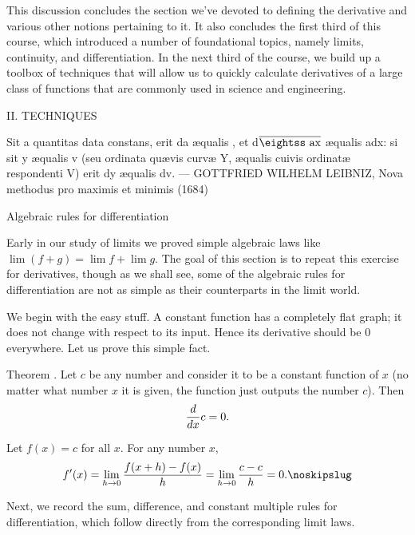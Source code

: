 This discussion concludes the section we've devoted to defining the derivative and various other
notions pertaining to it. It also concludes the first third of this course, which introduced a number of
foundational topics, namely limits, continuity, and differentiation. In the next
third of the course, we build up a toolbox of techniques that will allow us to quickly calculate derivatives
of a large class of functions that are commonly used in science and engineering.

\vfill\eject
\begingroup\headline{\hfil}\footline{\hfil}
\centerline{\titlefont II. TECHNIQUES}
\vskip220pt
\bigskip
\begingroup\obeylines\eightssi
\hfill Sit {\eightss a} quantitas data constans,
\hfill erit {\eightss da} {\ae}qualis {},
\hfill et {\eightss d$\overline{\hbox{\eightss ax}}$} {\ae}qualis {\eightss adx}:
\hfill si sit {\eightss y} {\ae}qualis {\eightss v}
\hfill (seu ordinata qu{\ae}vis curv{\ae} {\eightss Y},
\hfill {\ae}qualis cuivis ordinat{\ae} respondenti {\eightss V})
\hfill erit {\eightss dy} {\ae}qualis {\eightss dv}.
\eightss
\smallskip
\hfill --- GOTTFRIED WILHELM LEIBNIZ, {\eightssi Nova methodus pro maximis et minimis} (1684)
\endgroup%
\bigskip\goodbreak
\vfill\eject
\endgroup%

\advsect Algebraic rules for differentiation

Early in our study of limits we proved simple algebraic laws like $\lim (f+g) = \lim f + \lim g$. The
goal of this section is to repeat this exercise for derivatives, though as we shall see, some of the
algebraic rules for differentiation are not as simple as their counterparts in the limit world.

We begin with the easy stuff.
A constant function has a completely flat graph; it does not change with respect to its input.
Hence its derivative should be $0$ everywhere. Let us prove this simple fact.

\edef\thmconstantderiv{\the\thmcount}
\proclaim Theorem \advthm. Let $c$ be any number and consider it to be a constant
function of $x$ (no matter what number
$x$ it is given, the function just outputs the number $c$). Then
$${d\over dx} c = 0.$$

\proof Let $f(x) = c$ for all $x$. For any number $x$,
$$f'(x) = \lim_{h\to 0} {f(x+h) - f(x)\over h} = \lim_{h\to 0} {c-c\over h} = 0.\noskipslug$$

Next, we record the sum, difference, and constant multiple
rules for differentiation, which follow directly from the corresponding limit laws.

